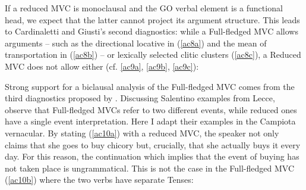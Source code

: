 \documentclass[output=paper]{langscibook}
\begin{document}
If a reduced MVC is monoclausal and the GO verbal element is a functional head, we expect that the latter cannot project its argument structure. This leads to Cardinaletti and Giusti’s second diagnostics: while a Full-fledged MVC allows arguments -- such as the directional  locative in (\ref{ac8a}) and the mean of transportation in (\ref{ac8b}) -- or lexically selected clitic clusters (\ref{ac8c}), a Reduced MVC does not allow either (cf. \ref{ac9a}, \ref{ac9b}, \ref{ac9c}):

\ea \label{ac8}
    \z
\ex \label{ac9}
    \z
\z

Strong support for a biclausal analysis of the Full-fledged MVC comes from the third diagnostics proposed by \citet{cardinaletti2001a, cardinaletti2019a}. Discussing Salentino examples from Lecce, \citet{cardinaletti2019a} observe that Full-fledged MVCs refer to two different events, while reduced ones have a single event interpretation. Here I adapt their examples in the Campiota vernacular.  By stating (\ref{ac10a}) with a reduced MVC, the speaker not only claims that she goes to buy chicory but, crucially, that she actually buys it every day. For this reason, the continuation which implies that the event of buying has not taken place is ungrammatical. This is not the case in the Full-fledged MVC (\ref{ac10b}) where the two verbs have separate Tenses:
\end{document}
